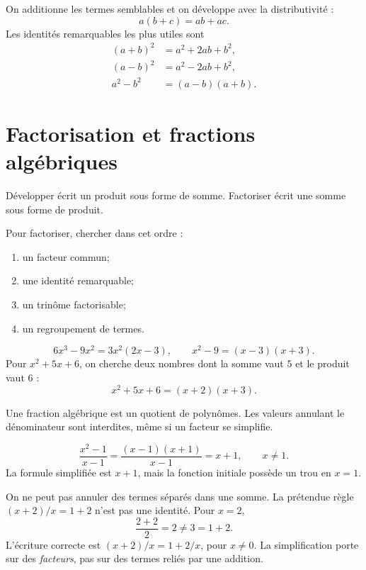 On additionne les termes semblables et on développe avec la distributivité :
\[
a(b+c)=ab+ac.
\]
Les identités remarquables les plus utiles sont
\begin{align*}
(a+b)^2&=a^2+2ab+b^2,\\
(a-b)^2&=a^2-2ab+b^2,\\
a^2-b^2&=(a-b)(a+b).
\end{align*}

\section{Factorisation et fractions algébriques}
\label{manual:section:02.02}

\begin{intuitionbox}
Développer écrit un produit sous forme de somme. Factoriser écrit une somme sous forme de produit.
\end{intuitionbox}

\begin{methodbox}
Pour factoriser, chercher dans cet ordre :
\begin{enumerate}
\item un facteur commun;
\item une identité remarquable;
\item un trinôme factorisable;
\item un regroupement de termes.
\end{enumerate}
\end{methodbox}

\begin{examplebox}
\[
6x^3-9x^2=3x^2(2x-3),
\qquad
x^2-9=(x-3)(x+3).
\]
Pour $x^2+5x+6$, on cherche deux nombres dont la somme vaut $5$ et le produit vaut $6$ :
\[
x^2+5x+6=(x+2)(x+3).
\]
\end{examplebox}

Une fraction algébrique est un quotient de polynômes. Les valeurs annulant le dénominateur sont interdites, même si un facteur se simplifie.

\begin{examplebox}
\[
\frac{x^2-1}{x-1}=\frac{(x-1)(x+1)}{x-1}=x+1,
\qquad x\neq1.
\]
La formule simplifiée est $x+1$, mais la fonction initiale possède un trou en $x=1$.
\end{examplebox}

\begin{counterbox}
On ne peut pas annuler des termes séparés dans une somme. La prétendue règle \((x+2)/x=1+2\) n'est pas une identité. Pour \(x=2\),
\[
\frac{2+2}{2}=2\ne3=1+2.
\]
L'écriture correcte est \((x+2)/x=1+2/x\), pour \(x\ne0\).
La simplification porte sur des \emph{facteurs}, pas sur des termes reliés par une addition.
\end{counterbox}

